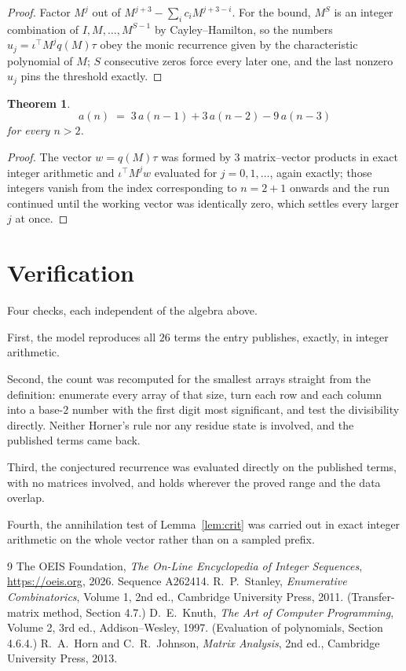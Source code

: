 \documentclass[11pt,a4paper]{article}
\theoremstyle{plain}
\newtheorem{theorem}{Theorem}
\theoremstyle{definition}
\begin{document}
\begin{proof}
Factor $M^{j}$ out of $M^{j+3}-\sum_ic_iM^{j+3-i}$. For the bound, $M^{S}$
is an integer combination of $I,M,\dots,M^{S-1}$ by Cayley--Hamilton, so the numbers
$u_j=\iota^{\!\top}M^{j}q(M)\tau$ obey the monic recurrence given by the characteristic
polynomial of $M$; $S$ consecutive zeros force every later one, and the last nonzero $u_j$
pins the threshold exactly.
\end{proof}

\begin{theorem}
\[
a(n)\;=\;3\,a(n-1) + 3\,a(n-2) - 9\,a(n-3)
\]
for every $n>2$.
\end{theorem}

\begin{proof}
The vector $w=q(M)\tau$ was formed by $3$ matrix--vector products in exact integer
arithmetic and $\iota^{\!\top}M^{j}w$ evaluated for $j=0,1,\dots$, again exactly; those
integers vanish from the index corresponding to $n=2+1$ onwards and the run continued
until the working vector was identically zero, which settles every larger $j$ at once.
\end{proof}

\section{Verification}

Four checks, each independent of the algebra above.

First, the model reproduces all $26$ terms the entry publishes, exactly, in integer
arithmetic.

Second, the count was recomputed for the smallest arrays straight from the definition:
enumerate every array of that size, turn each row and each column into a base-$2$ number with
the first digit most significant, and test the divisibility directly. Neither Horner's rule nor
any residue state is involved, and the published terms came back.

Third, the conjectured recurrence was evaluated directly on the published terms, with no
matrices involved, and holds wherever the proved range and the data overlap.

Fourth, the annihilation test of Lemma~\ref{lem:crit} was carried out in exact integer
arithmetic on the whole vector rather than on a sampled prefix.

\begin{thebibliography}{9}
 The OEIS Foundation, \emph{The On-Line Encyclopedia of Integer
Sequences}, \url{https://oeis.org}, 2026. Sequence A262414.
 R.~P.~Stanley, \emph{Enumerative Combinatorics}, Volume 1, 2nd ed.,
Cambridge University Press, 2011. (Transfer-matrix method, Section 4.7.)
 D.~E.~Knuth, \emph{The Art of Computer Programming}, Volume 2, 3rd ed.,
Addison--Wesley, 1997. (Evaluation of polynomials, Section 4.6.4.)
 R.~A.~Horn and C.~R.~Johnson, \emph{Matrix Analysis}, 2nd ed., Cambridge
University Press, 2013.
\end{thebibliography}
\end{document}
